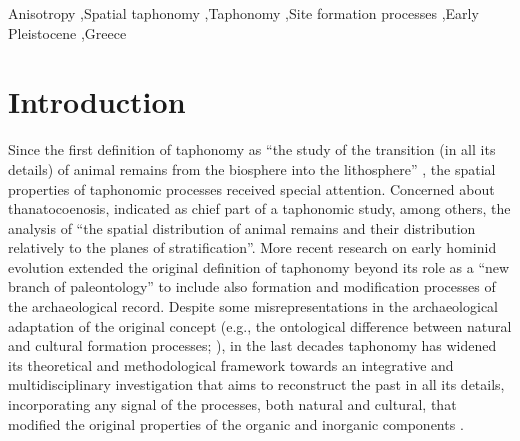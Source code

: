\documentclass[review,times,authoryear]{elsarticle} %
\begin{document}
\begin{frontmatter}
  \begin{keyword} %
    Anisotropy \sep Spatial taphonomy \sep Taphonomy \sep Site formation processes \sep Early Pleistocene \sep Greece
  \end{keyword}
  
\end{frontmatter}

\linenumbers

\section{Introduction}

Since the first definition of taphonomy as ``the study of the transition (in all its details) of animal remains from the biosphere into the lithosphere'' \citep{Efremov1940}, the spatial properties of taphonomic processes received special attention. Concerned about thanatocoenosis, \cite{Efremov1940} indicated as chief part of a taphonomic study, among others, the analysis of ``the spatial distribution of animal remains and their distribution relatively to the planes of stratification''. More recent research on early hominid evolution \citep{Behrensmeyer1975,Boaz1976,Hill1976} extended the original definition of taphonomy beyond its role as a ``new branch of paleontology'' \citep{Efremov1940} to include also formation and modification processes of the archaeological record. Despite some misrepresentations in the archaeological adaptation of the original concept (e.g., the ontological difference between natural and cultural formation processes; \citealp{Lyman2010,Dominguez-Rodrigo2011}), in the last decades taphonomy has widened its theoretical and methodological framework towards an integrative and multidisciplinary investigation that aims to reconstruct the past in all its details, incorporating any signal of the processes, both natural and cultural, that modified the original properties of the organic and inorganic components \citep{Dominguez-Rodrigo2011}.
\end{document}
